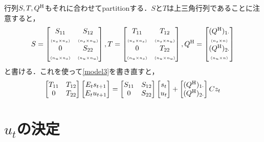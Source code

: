 \documentclass[a4j, dvipdfmx]{jarticle}
\begin{document}
行列$S, T, Q^{\rm{H}}$もそれに合わせてpartitionする．$S$と$T$は上三角行列であることに注意すると，
\begin{align}
S = \begin{bmatrix}S_{11} & S_{12} \\
{\scriptscriptstyle (n_s \times n_s)} & {\scriptscriptstyle (n_s \times n_u)}\\
0 & S_{22} \\
{\scriptscriptstyle (n_u \times n_s)} & {\scriptscriptstyle (n_u \times n_u)}\end{bmatrix},
T = \begin{bmatrix}T_{11} & T_{12} \\
{\scriptscriptstyle (n_s \times n_s)} & {\scriptscriptstyle (n_s \times n_u)}\\
0 & T_{22} \\
{\scriptscriptstyle (n_u \times n_s)} & {\scriptscriptstyle (n_u \times n_u)}\end{bmatrix},
Q^{\rm{H}} = \begin{bmatrix}(Q^{\rm{H}})_{1\cdot} \\
{\scriptscriptstyle (n_s \times n)}\\
(Q^{\rm{H}})_{2\cdot} \\
{\scriptscriptstyle (n_u \times n)}\end{bmatrix}
\end{align}
と書ける．これを使って\eqref{model3}を書き直すと，
\begin{align}
\begin{bmatrix}T_{11} & T_{12} \\ 0 & T_{22}\end{bmatrix} \begin{bmatrix}E_ts_{t+1} \\ E_tu_{t+1}\end{bmatrix} = \begin{bmatrix}S_{11} & S_{12} \\ 0 & S_{22}\end{bmatrix} \begin{bmatrix} s_t \\ u_t\end{bmatrix} + \begin{bmatrix}(Q^{\rm{H}})_{1\cdot} \\ (Q^{\rm{H}})_{2\cdot}\end{bmatrix}Cz_t\label{model4}
\end{align}

\section{$u_t$の決定}
\end{document}
